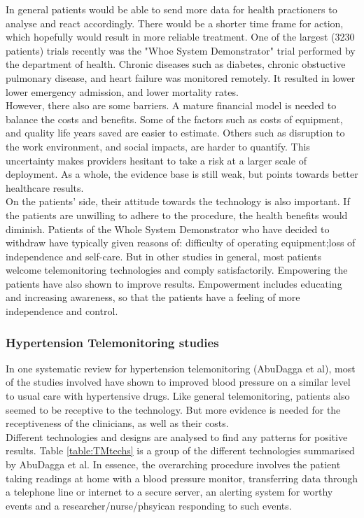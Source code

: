 \documentclass[11pt]{article}
\begin{document}
In general patients would be able to send more data for health practioners to analyse and react accordingly.  There would be a shorter time frame for action, which hopefully would result in more reliable treatment.  One of the largest (3230 patients) trials recently was the "Whoe System Demonstrator" trial performed by the department of health.  Chronic diseases such as diabetes, chronic obstuctive pulmonary disease, and heart failure was monitored remotely.  It resulted in lower lower emergency admission, and lower mortality rates.  
\\ \indent
However, there also are some barriers.  A mature financial model is needed to balance the costs and benefits. Some of the factors such as costs of equipment, and quality life years saved are easier to estimate.  Others such as disruption to the work environment, and social impacts, are harder to quantify. This uncertainty makes providers hesitant to take a risk at a larger scale of deployment.  As a whole, the evidence base is still weak, but points towards better healthcare results.\cite{TM5} 
\\ \indent
On the patients' side, their attitude towards the technology is also important.  If the patients are unwilling to adhere to the procedure, the health benefits would diminish.  Patients of the Whole System Demonstrator who have decided to withdraw have typically given reasons of: difficulty of operating equipment;loss of independence and self-care.\cite{TM4}  But in other studies in general, most patients welcome telemonitoring technologies and comply satisfactorily.  Empowering the patients have also shown to improve results.  Empowerment includes educating and increasing awareness, so that the patients have a feeling of more independence and control. \cite{TM6}
\\ \indent
\subsubsection{Hypertension Telemonitoring studies}
In one systematic review for hypertension telemonitoring (AbuDagga et al)\cite{impact Lit}, most of the studies involved have shown to improved blood pressure on a similar level to usual care with hypertensive drugs. Like general telemonitoring, patients also seemed to be receptive to the technology. But more evidence is needed for the receptiveness of the clinicians, as well as their costs.   
\\ \indent
Different technologies and designs are analysed to find any patterns for positive results. Table \ref{table:TMtechs} is a group of the different technologies summarised by AbuDagga et al.  In essence, the overarching procedure involves the patient taking readings at home with a blood pressure monitor, transferring data through a telephone line or internet to a secure server, an alerting system for worthy events and a researcher/nurse/phsyican responding to such events.
\end{document}

